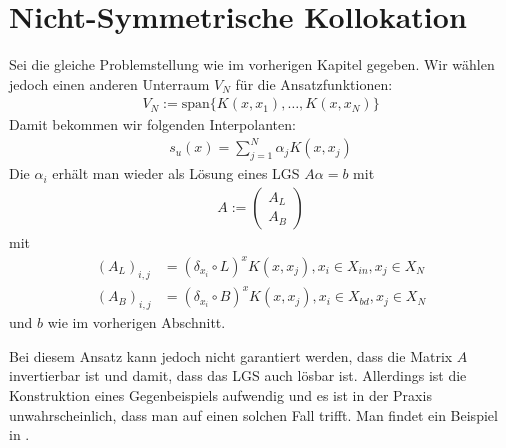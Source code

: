 \section{Nicht-Symmetrische Kollokation}
\label{sec:NSymKol}
Sei die gleiche Problemstellung wie im vorherigen Kapitel gegeben. Wir wählen jedoch einen anderen Unterraum $V_N$ für die Ansatzfunktionen:
\begin{align*}
V_N := \text{span} \{K(x,x_1), \dots, K(x,x_N) \}
\end{align*}
Damit bekommen wir folgenden Interpolanten:
\begin{align*}
s_u(x) = \sum_{j=1}^N \alpha_j K(x,x_j)
\end{align*}
Die $\alpha_i$ erhält man wieder als Lösung eines \ac{LGS} $A \alpha = b$ mit
\begin{align*}
A := \begin{pmatrix}
A_L \\ 
A_B
\end{pmatrix} 
\end{align*}
mit
\begin{align*}
(A_L)_{i,j} &= (\delta_{x_i} \circ L)^x K(x,x_j), x_i \in X_{in}, x_j \in X_N\\
(A_B)_{i,j} &= (\delta_{x_i} \circ B)^x K(x,x_j), x_i \in X_{bd}, x_j \in X_N
\end{align*}
und
$b$ wie im vorherigen Abschnitt.

Bei diesem Ansatz kann jedoch nicht garantiert werden, dass die Matrix $A$ invertierbar ist und damit, dass das \ac{LGS} auch lösbar ist. Allerdings ist die Konstruktion eines Gegenbeispiels aufwendig und es ist in der Praxis unwahrscheinlich, dass man auf einen solchen Fall trifft. Man findet ein Beispiel in \textcite{Hon.2001}.
